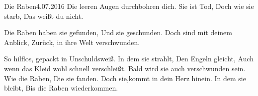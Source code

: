 \begin{poem}{Die Raben}{4.07.2016}
Die leeren Augen durchbohren dich.
Sie ist Tod,
Doch wie sie starb,
Das weißt du nicht.

Die Raben haben sie gefunden,
Und sie geschunden.
Doch sind mit deinem Anblick,
Zurück, in ihre Welt verschwunden.

So hilflos, gepackt in Unschuldsweiß.
In dem sie strahlt,
Den Engeln gleicht,
Auch wenn das Kleid wohl schnell verschleißt.
Bald wird sie auch verschwunden sein.
Wie die Raben,
Die sie fanden.
Doch sie,kommt in dein Herz hinein.
In dem sie bleibt,
Bis die Raben wiederkommen.
\end{poem}
